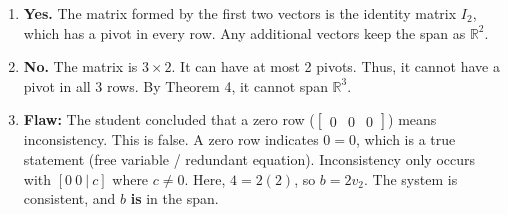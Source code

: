 \documentclass[12pt]{article}
\begin{document}
\begin{enumerate}
    \item \textbf{Yes.} The matrix formed by the first two vectors is the identity matrix $I_2$, which has a pivot in every row. Any additional vectors keep the span as $\mathbb{R}^2$.
    \item \textbf{No.} The matrix is $3 \times 2$. It can have at most 2 pivots. Thus, it cannot have a pivot in all 3 rows. By Theorem 4, it cannot span $\mathbb{R}^3$.
    \item \textbf{Flaw:} The student concluded that a zero row ($\begin{bmatrix} 0 & 0 & 0 \end{bmatrix}$) means inconsistency. This is false. A zero row indicates $0=0$, which is a true statement (free variable / redundant equation). Inconsistency only occurs with $[0 \ 0 \ | \ c]$ where $c \neq 0$. Here, $4=2(2)$, so $b=2v_2$. The system is consistent, and $b$ \textbf{is} in the span.
\end{enumerate}
\end{document}
